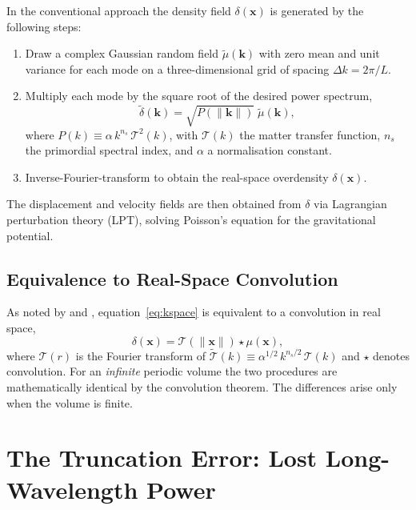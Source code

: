 \documentclass[12pt]{article}
\begin{document}
In the conventional approach the density field $\delta(\mathbf{x})$ is
generated by the following steps:
%
\begin{enumerate}
  \item Draw a complex Gaussian random field $\tilde{\mu}(\mathbf{k})$
        with zero mean and unit variance for each mode on a
        three-dimensional grid of spacing $\Delta k = 2\pi/L$.
  \item Multiply each mode by the square root of the desired power
        spectrum,
        \begin{equation}
          \tilde{\delta}(\mathbf{k}) = \sqrt{P(\|\mathbf{k}\|)}\;
          \tilde{\mu}(\mathbf{k}),
          \label{eq:kspace}
        \end{equation}
        where $P(k) \equiv \alpha\,k^{n_s}\,\mathcal{T}^2(k)$, with
        $\mathcal{T}(k)$ the matter transfer function, $n_s$ the
        primordial spectral index, and $\alpha$ a normalisation constant.
  \item Inverse-Fourier-transform to obtain the real-space overdensity
        $\delta(\mathbf{x})$.
\end{enumerate}
%
The displacement and velocity fields are then obtained from $\delta$ via
Lagrangian perturbation theory (LPT), solving Poisson's equation for the
gravitational potential.

\subsection{Equivalence to Real-Space Convolution}

As noted by \citet{Pen1997} and \citet{Hahn2011}, equation~\eqref{eq:kspace}
is equivalent to a convolution in real space,
\begin{equation}
  \delta(\mathbf{x}) = \mathcal{T}(\|\mathbf{x}\|) \star \mu(\mathbf{x}),
  \label{eq:realconv}
\end{equation}
where $\mathcal{T}(r)$ is the Fourier transform of
$\tilde{\mathcal{T}}(k) \equiv \alpha^{1/2}\,k^{n_s/2}\,\mathcal{T}(k)$
and $\star$ denotes convolution. For an \emph{infinite} periodic volume
the two procedures are mathematically identical by the convolution
theorem. The differences arise only when the volume is finite.

\section{The Truncation Error: Lost Long-Wavelength Power}
\label{sec:truncation}
\end{document}
